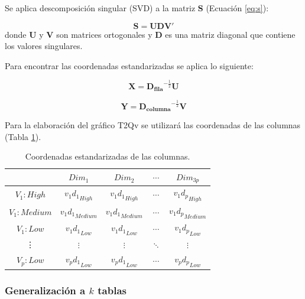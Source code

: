 \documentclass[mathematics,article,submit,moreauthors,pdftex]{mdpi}
\begin{document}
Se aplica descomposición singular (SVD) a la matriz \textbf{S} (Ecuación
\ref{eq:s}):

\begin{equation}
\mathbf{S}=\mathbf{U}\mathbf{D}\mathbf{V'}
\label{eq:svd}
\end{equation} donde \(\mathbf{U}\) y \(\mathbf{V}\) son matrices
ortogonales y \(\mathbf{D}\) es una matriz diagonal que contiene los
valores singulares.

Para encontrar las coordenadas estandarizadas se aplica lo siguiente:

\begin{equation}
\mathbf{X}=\mathbf{D_{fila}}^{-\frac{1}{2}} \mathbf{U}
\label{eq:xcoor}
\end{equation}

\begin{equation}
\mathbf{Y}=\mathbf{D_{columna}}^{-\frac{1}{2}} \mathbf{V}
\label{eq:ycoor}
\end{equation}

Para la elaboración del gráfico T2Qv se utilizará las coordenadas de las
columnas (Tabla \ref{tab:colcoor}).

\begin{table}[!ht]
\begin{center}
 \begin{tabular}{|| c ||c c c c||} 
 \hline
 & $Dim_{1}$      & $Dim_{2}$ & $\cdots$ & $Dim_{3p}$ \\ [0.5ex] 
 \hline\hline
  $V_{1}:High$    & ${v_{1}d_{1}}_{High}$& ${v_{1}d_{1}}_{High}$  & $\cdots$ & ${v_{1}d_{p}}_{High}$\\
 \hline
 $V_{1}:Medium$    &${v_{1}d_{1}}_{Medium}$ & ${v_{1}d_{1}}_{Medium}$ & $\cdots$ & ${v_{1}d_{p}}_{Medium}$\\
\hline
 $V_{1}:Low$     &${v_{1}d_{1}}_{Low}$ & ${v_{1}d_{1}}_{Low}$  &$\cdots$ & ${v_{1}d_{p}}_{Low}$\\
\hline
\vdots & $\vdots$ & $\vdots$  &$\ddots$& $\vdots$\\
\hline
 $V_{p}:Low$     &${v_{p}d_{1}}_{Low}$ & ${v_{p}d_{1}}_{Low}$ & $\cdots$ & ${v_{p} d_{p}} _{Low}$ \\ [1ex] 
 \hline
\end{tabular}\caption{Coordenadas estandarizadas de las columnas.}
\label{tab:colcoor}
\end{center}
\end{table}

\hypertarget{generalizaciuxf3n-a-k-tablas}{%
\subsubsection{\texorpdfstring{Generalización a \(k\)
tablas}{Generalización a k tablas}}\label{generalizaciuxf3n-a-k-tablas}}
\end{document}
